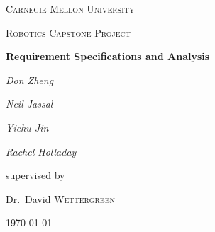 \documentclass{spec}
\begin{document}
\begin{titlepage}
	\centering
	{\scshape\LARGE Carnegie Mellon University \par}
	\vspace{1cm}
	{\scshape\Large Robotics Capstone Project\par}
	\vspace{1.5cm}
	{\huge\bfseries Requirement Specifications and Analysis\par}
	\vspace{2cm}
	{\Large\itshape Don Zheng\par}
	{\Large\itshape Neil Jassal\par}
	{\Large\itshape Yichu Jin\par}
	{\Large\itshape Rachel Holladay\par}
	\vfill
	supervised by\par
	Dr.~David \textsc{Wettergreen}

	\vfill

	{\large \today\par}
\end{titlepage}

\tableofcontents
\listoffigures
\listoftables
\newpage






\end{document}
